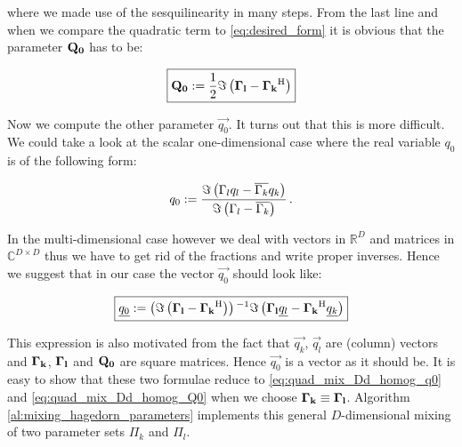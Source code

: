 where we made use of the sesquilinearity in many steps. From the last line and when
we compare the quadratic term to \eqref{eq:desired_form} it is obvious that the
parameter $\mathbf{Q_0}$ has to be:

\begin{equation} \label{eq:quad_mix_Dd_inhomog_Q0}
\boxed{
  \mathbf{Q_0} := \frac{1}{2}\Im\left( \mathbf{\Gamma_l} - \mathbf{\Gamma_k}{}^{\textnormal{H}} \right)
}
\end{equation}

Now we compute the other parameter $\vec{q_0}$. It turns out that this is more difficult.
We could take a look at the scalar one-dimensional case where the real variable
$q_0$ is of the following form:

\begin{equation*}
  q_0 := \frac{\Im\left( \Gamma_l q_l - \overline{\Gamma_k}q_k \right)}{\Im\left( \Gamma_l - \overline{\Gamma_k} \right)} \,.
\end{equation*}

In the multi-dimensional case however we deal with vectors in $\mathbb{R}^D$ and
matrices in $\mathbb{C}^{D \times D}$ thus we have to get rid of the fractions
and write proper inverses. Hence we suggest that in our case the vector $\vec{q_0}$
should look like:

\begin{equation} \label{eq:quad_mix_Dd_inhomog_q0}
\boxed{
  \underline{q_0} := \left( \Im\left( \mathbf{\Gamma_l} - \mathbf{\Gamma_k}{}^{\textnormal{H}} \right) \right){}^{-1} \Im\left( \mathbf{\Gamma_l} \underline{q_l} - \mathbf{\Gamma_k}{}^{\textnormal{H}} \underline{q_k} \right)
}
\end{equation}

This expression is also motivated from the fact that $\vec{q_k}$, $\vec{q_l}$ are (column)
vectors and $\mathbf{\Gamma_k}$, $\mathbf{\Gamma_l}$ and $\mathbf{Q_0}$ are square matrices.
Hence $\vec{q_0}$ is a vector as it should be. It is easy to show that these two
formulae reduce to \eqref{eq:quad_mix_Dd_homog_q0} and  \eqref{eq:quad_mix_Dd_homog_Q0} when we
choose $\mathbf{\Gamma_k} \equiv \mathbf{\Gamma_l}$. Algorithm \ref{al:mixing_hagedorn_parameters}
implements this general $D$-dimensional mixing of two parameter sets $\Pi_k$ and $\Pi_l$.


